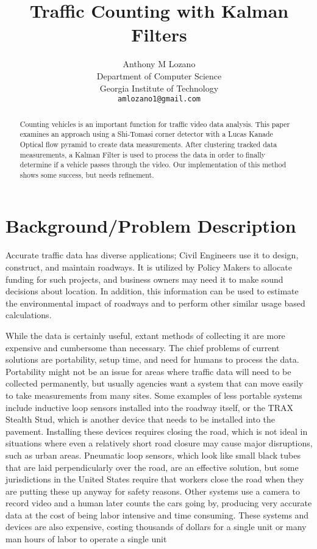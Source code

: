 \documentclass{article} %
\title{Traffic Counting with Kalman Filters}
\author{
Anthony M Lozano\\
Department of Computer Science\\
Georgia Institute of Technology\\
\texttt{amlozano1@gmail.com} \\
}
\begin{document}
\maketitle

\begin{abstract}
Counting vehicles is an important function for traffic video data analysis. This paper examines an approach using a Shi-Tomasi corner detector with a Lucas Kanade Optical flow pyramid to create data measurements. After clustering tracked data measurements, a Kalman Filter is used to process the data in order to finally determine if a vehicle passes through the video. Our implementation of this method shows some success, but needs refinement.
\end{abstract}

\section{Background/Problem Description}
\label{sec:background}

Accurate traffic data has diverse applications; Civil Engineers use it to design, construct, and maintain roadways.  It is utilized by Policy Makers to allocate funding for such projects, and business owners may need it to make sound decisions about location. In addition, this information can be used to estimate the environmental impact of roadways and to perform other similar usage based calculations.

While the data is certainly useful, extant methods of collecting it are more expensive and cumbersome than necessary. The chief problems of current solutions are portability, setup time, and need for humans to process the data. Portability might not be an issue for areas where traffic data will need to be collected permanently, but usually agencies want a system that can move easily to take measurements from many sites. Some examples of less portable systems include inductive loop sensors installed into the roadway itself, or the TRAX Stealth Stud, which is another device that needs to be installed into the pavement.  Installing these devices requires closing the road, which is not ideal in situations where even a relatively short road closure may cause major disruptions, such as urban areas. Pneumatic loop sensors, which look like small black tubes that are laid perpendicularly over the road, are an effective solution, but some jurisdictions in the United States require that workers close the road when they are putting these up anyway for safety reasons. Other systems use a camera to record video and a human later counts the cars going by, producing very accurate data at the cost of being labor intensive and time consuming. These systems and devices are also expensive, costing thousands of dollars for a single unit or many man hours of labor to operate a single unit
\end{document}
